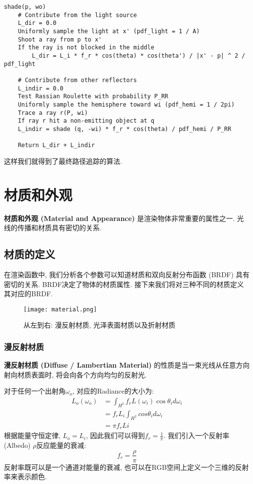 \documentclass[openany]{progbookcn}
\begin{document}
\begin{lstlisting}[caption=渲染函数伪代码]
	shade(p, wo)
	# Contribute from the light source
	L_dir = 0.0
	Uniformly sample the light at x' (pdf_light = 1 / A)
	Shoot a ray from p to x'
	If the ray is not blocked in the middle
		L_dir = L_i * f_r * cos(theta) * cos(theta') / |x' - p| ^ 2 / pdf_light
	
	# Contribute from other reflectors
	L_indir = 0.0
	Test Rassian Roulette with probability P_RR
	Uniformly sample the hemisphere toward wi (pdf_hemi = 1 / 2pi)
	Trace a ray r(P, wi)
	If ray r hit a non-emitting object at q
	L_indir = shade (q, -wi) * f_r * cos(theta) / pdf_hemi / P_RR
	
	Return L_dir + L_indir
\end{lstlisting}

这样我们就得到了最终路径追踪的算法. 


\chapter{材质和外观}

\textbf{材质和外观 (Material and Appearance) }是渲染物体非常重要的属性之一. 光线的传播和材质具有密切的关系. 

\section{材质的定义}

在渲染函数中, 我们分析各个参数可以知道材质和双向反射分布函数 (BRDF) 具有密切的关系. BRDF决定了物体的材质属性. 接下来我们将对三种不同的材质定义其对应的BRDF. 

\begin{figure}[H]
	\centering
	\texttt{[image: material.png]}
	\caption{从左到右: 漫反射材质, 光泽表面材质以及折射材质}
	\label{fig:material}
\end{figure}

\subsection{漫反射材质}
\textbf{漫反射材质 (Diffuse / Lambertian Material) }的性质是当一束光线从任意方向射向材质表面时, 将会向各个方向均匀的反射光. 

对于任何一个出射角$\omega_o$, 对应的Radiance的大小为: 
\begin{equation}
	\begin{split}
		L_o(\omega_o)&=\int_{H^2}f_rL(\omega_i)\cos\theta_id\omega_i\\
		&=f_rL_i\int_{H^2}cos\theta_id\omega_i\\
		&=\pi f_r Li
	\end{split}
\end{equation}
根据能量守恒定律, $L_o=L_i$, 因此我们可以得到$f_r=\frac{1}{\pi}$. 我们引入一个反射率 (Albedo) $\rho$反应能量的衰减: 
\begin{equation}
	f_r=\frac{\rho}{\pi}
\end{equation}
反射率既可以是一个通道对能量的衰减, 也可以在RGB空间上定义一个三维的反射率来表示颜色. 
\end{document}
